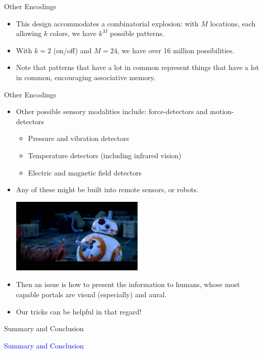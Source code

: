 \documentclass{beamer}
\begin{document}
\begin{frame}{Other Encodings}
   \begin{itemize}
      \item This design accommodates a combinatorial explosion: with $M$ locations, each allowing $k$ colors, we have $k^M$ possible patterns.
      \item With $k = 2$ (on/off) and $M = 24$, we have over 16 million possibilities.
      \item Note that patterns that have a lot in common represent things that have a lot in common, encouraging associative memory.
   \end{itemize}
\end{frame}

\begin{frame}{Other Encodings}
   \begin{itemize}
      \item Other possible sensory modalities include: force-detectors and motion-detectors
      \begin{itemize}
         \item Pressure and vibration detectors
         \item Temperature detectors (including infrared vision)
         \item Electric and magnetic field detectors
      \end{itemize}
      \item Any of these might be built into remote sensors, or robots.
      \begin{center}
         \includegraphics[width=0.5\textwidth]{figures/bb8.jpg}
      \end{center}
      \item Then an issue is how to present the information to humans, whose most capable portals are visual (especially) and aural.
      \item Our tricks can be helpful in that regard!
   \end{itemize}
\end{frame}

\begin{frame}{Summary and Conclusion}
   \begin{center}
      \Huge \textcolor{blue}{Summary and Conclusion}
   \end{center}
\end{frame}
\end{document}
